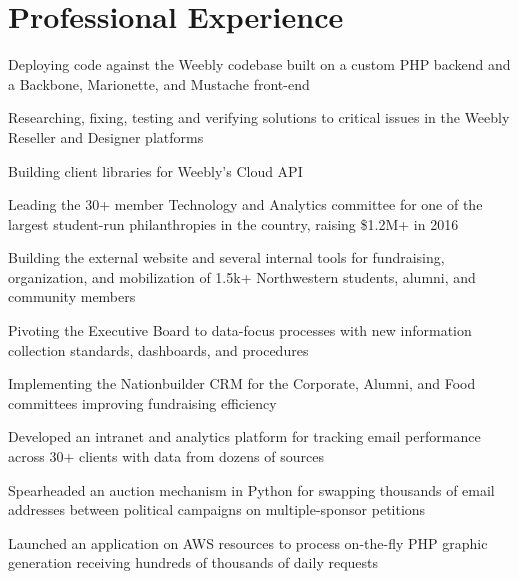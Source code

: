 
\section{Professional Experience}

\vspace{\topsep}
\begin{listitems}
\item Deploying code against the Weebly codebase built on a custom PHP backend and a Backbone, Marionette, and Mustache front-end
\item Researching, fixing, testing and verifying solutions to critical issues in the Weebly Reseller and Designer platforms
\item Building client libraries for Weebly's Cloud API
\end{listitems}
\sectionsep

\begin{listitems}
\item Leading the 30+ member Technology and Analytics committee for one of the largest student-run philanthropies in the country, raising \$1.2M+ in 2016
\item Building the external website and several internal tools for fundraising, organization, and mobilization of 1.5k+ Northwestern students, alumni, and community members
\item Pivoting the Executive Board to data-focus processes with new information collection standards, dashboards, and procedures
\item Implementing the Nationbuilder CRM for the Corporate, Alumni, and Food committees improving fundraising efficiency
\end{listitems}
\sectionsep

\begin{listitems}
\item Developed an intranet and analytics platform for tracking email performance across 30+ clients with data from dozens of sources
\item Spearheaded an auction mechanism in Python for swapping thousands of email addresses between political campaigns on multiple-sponsor petitions
\item Launched an application on AWS resources to process on-the-fly PHP graphic generation receiving hundreds of thousands of daily requests
\end{listitems}
\sectionsep

